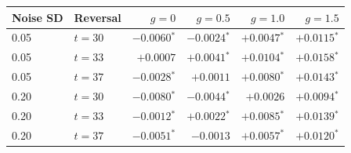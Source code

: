 \begin{tabular}{llrrrr}
\toprule
Noise SD & Reversal & $g=0$ & $g=0.5$ & $g=1.0$ & $g=1.5$ \\
\midrule
0.05 & $t=30$ & $-0.0060$$^{*}$ & $-0.0024$$^{*}$ & $+0.0047$$^{*}$ & $+0.0115$$^{*}$ \\
0.05 & $t=33$ & $+0.0007$ & $+0.0041$$^{*}$ & $+0.0104$$^{*}$ & $+0.0158$$^{*}$ \\
0.05 & $t=37$ & $-0.0028$$^{*}$ & $+0.0011$ & $+0.0080$$^{*}$ & $+0.0143$$^{*}$ \\
0.20 & $t=30$ & $-0.0080$$^{*}$ & $-0.0044$$^{*}$ & $+0.0026$ & $+0.0094$$^{*}$ \\
0.20 & $t=33$ & $-0.0012$$^{*}$ & $+0.0022$$^{*}$ & $+0.0085$$^{*}$ & $+0.0139$$^{*}$ \\
0.20 & $t=37$ & $-0.0051$$^{*}$ & $-0.0013$ & $+0.0057$$^{*}$ & $+0.0120$$^{*}$ \\
\bottomrule
\end{tabular}
